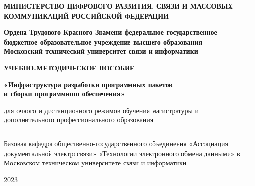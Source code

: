 \thispagestyle{empty}
\begin{center} 
{\sffamily
{\bfseries\normalsize МИНИСТЕРСТВО ЦИФРОВОГО РАЗВИТИЯ, СВЯЗИ И МАССОВЫХ\\ 
КОММУНИКАЦИЙ РОССИЙСКОЙ ФЕДЕРАЦИИ}
\par\vspace{\baselineskip}
{\bfseries\normalsize Ордена Трудового Красного Знамени федеральное государственное бюджетное образовательное учреждение высшего образования\\
Московский технический университет связи и информатики}


{\bfseries\huge УЧЕБНО-МЕТОДИЧЕСКОЕ ПОСОБИЕ}
\par\vspace{\baselineskip}
{\bfseries\Large «Инфраструктура разработки программных пакетов\\и сборки программного обеспечения»}
\par\vspace{\baselineskip}

{\normalsize для очного и дистанционного режимов обучения магистратуры и дополнительного профессионального образования

\par\vspace{4\baselineskip}
\hrule height 1pt
\smallskip
Базовая кафедра общественно-государственного объединения 
«Ассоциация документальной электросвязи»
«Технологии электронного обмена данными» в Московском техническом университете связи и информатики



2023}
}
\end{center}
